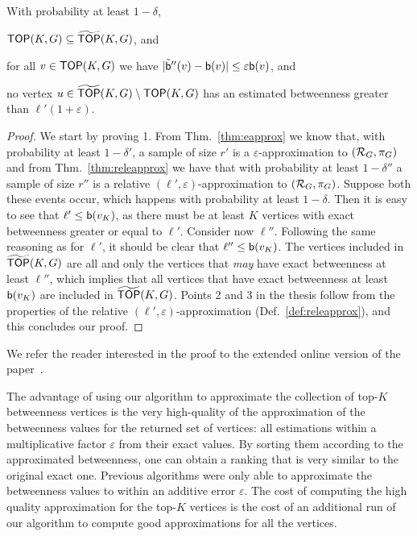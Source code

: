 \begin{lemma}
  With probability at least $1-\delta$, 
  \begin{enumerate*}
    \item $\mathsf{TOP}(K,G)\subseteq \widetilde{\mathsf{TOP}}(K,G)$, and
    \item for all $v\in\mathsf{TOP}(K,G)$ we have
      $|\tilde{\mathsf{b}}''(v)-\mathsf{b}(v)|\le\varepsilon\mathsf{b}(v)$, and
    \item no vertex $u\in\widetilde{\mathsf{TOP}}(K,G)\setminus\mathsf{TOP}(K,G)$ has an estimated
      betweenness greater than $\ell'(1+\varepsilon)$.
  \end{enumerate*}
\end{lemma}
\ifproof
\begin{proof}
  We start by proving 1. From Thm.~\ref{thm:eapprox} we know that, with probability at least
  $1-\delta'$, a sample of size $r'$ is a $\varepsilon$-approximation to
  $(\mathcal{R}_G,\pi_G)$ and from Thm.~\ref{thm:releapprox} we have that with
  probability at least $1-\delta''$ a sample of size $r''$ is a relative
  $(\ell',\varepsilon)$-approximation to $(\mathcal{R}_G,\pi_G)$. Suppose both these
  events occur, which happens with probability at least $1-\delta$. Then it is
  easy to see that $\ell'\le\mathsf{b}(v_K)$, as there must be at least $K$ vertices
  with exact betweenness greater or equal to $\ell'$.  Consider now $\ell''$.
  Following the same reasoning as for $\ell'$, it should be clear that
  $\ell''\le\mathsf{b}(v_K)$. The vertices included in $\widetilde{\mathsf{TOP}}(K,G)$ are all and
  only the vertices that \emph{may} have exact betweenness at least $\ell''$,
  which implies that all vertices that have exact betweenness at least
  $\mathsf{b}(v_K)$ are included in $\widetilde{\mathsf{TOP}}(K,G)$. 
  Points 2 and 3 in the thesis follow from the properties of the relative
  $(\ell',\varepsilon)$-approximation (Def.~\ref{def:releapprox}), and this
  concludes our proof.
\end{proof}
\else
We refer the reader interested in the proof to the extended online version of
the paper~\citep{RiondatoK13}.
\fi

The advantage of using our algorithm to approximate the collection of top-$K$
betweenness vertices is the very high-quality of the approximation of the
betweenness values for the returned set of vertices: all estimations within a
multiplicative factor $\varepsilon$ from their exact values. By sorting 
them according to the approximated betweenness, one can obtain a ranking that is
very similar to the original exact one. Previous algorithms were only able to
approximate the betweenness values to within an additive error $\varepsilon$.
The cost of computing the high quality approximation for the top-$K$ vertices is
the cost of an additional run of our algorithm to compute good approximations
for all the vertices.

